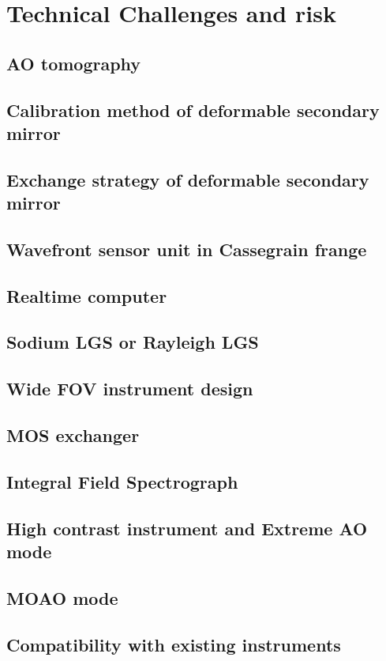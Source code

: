 \chapter{Technical Challenges and risk
\label{chap:risk}}

\section{AO tomography}
\section{Calibration method of deformable secondary mirror}
\section{Exchange strategy of deformable secondary mirror}
\section{Wavefront sensor unit in Cassegrain frange}
\section{Realtime computer}
\section{Sodium LGS or Rayleigh LGS}
\section{Wide FOV instrument design}
\section{MOS exchanger}
\section{Integral Field Spectrograph}
\section{High contrast instrument and Extreme AO mode}
\section{MOAO mode}
\section{Compatibility with existing instruments}

